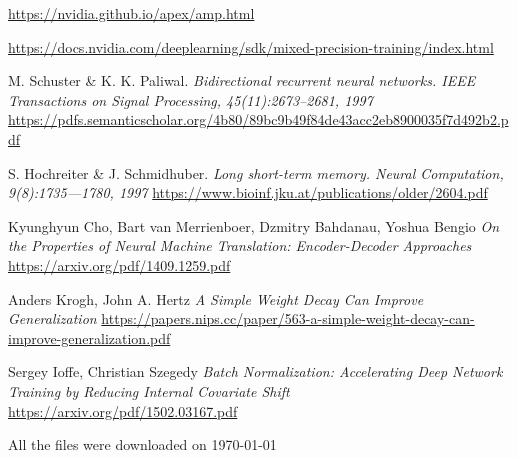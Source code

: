 \documentclass[licencjacka,en]{pracamgr}
\newcommand{\bibDownloadDate}{\today}
\begin{document}
\begin{thebibliography}{99}
 \href{https://nvidia.github.io/apex/amp.html}{https://nvidia.github.io/apex/amp.html}

 \href{https://docs.nvidia.com/deeplearning/sdk/mixed-precision-training/index.html}{https://docs.nvidia.com/deeplearning/sdk/mixed-precision-training/index.html}

 M. Schuster \& K. K. Paliwal. \textit{Bidirectional recurrent neural networks. IEEE Transactions on Signal Processing, 45(11):2673–2681, 1997} \href{https://pdfs.semanticscholar.org/4b80/89bc9b49f84de43acc2eb8900035f7d492b2.pdf}{https://pdfs.semanticscholar.org/4b80/89bc9b49f84de43acc2eb8900035f7d492b2.pdf}

 S. Hochreiter \& J. Schmidhuber. \textit{Long short-term memory. Neural Computation, 9(8):1735—1780, 1997} \href{https://www.bioinf.jku.at/publications/older/2604.pdf}{https://www.bioinf.jku.at/publications/older/2604.pdf}

 Kyunghyun Cho, Bart van Merrienboer, Dzmitry Bahdanau, Yoshua Bengio \textit{On the Properties of Neural Machine Translation: Encoder-Decoder Approaches} \href{https://arxiv.org/pdf/1409.1259.pdf}{https://arxiv.org/pdf/1409.1259.pdf}

 Anders Krogh, John A. Hertz \textit{A Simple Weight Decay Can Improve Generalization} \href{https://papers.nips.cc/paper/563-a-simple-weight-decay-can-improve-generalization.pdf}{https://papers.nips.cc/paper/563-a-simple-weight-decay-can-improve-generalization.pdf}

 Sergey Ioffe, Christian Szegedy \textit{Batch Normalization: Accelerating Deep Network Training by Reducing Internal Covariate Shift} \href{https://arxiv.org/pdf/1502.03167.pdf}{https://arxiv.org/pdf/1502.03167.pdf}
\end{thebibliography}
All the files were downloaded on \bibDownloadDate
\end{document}
